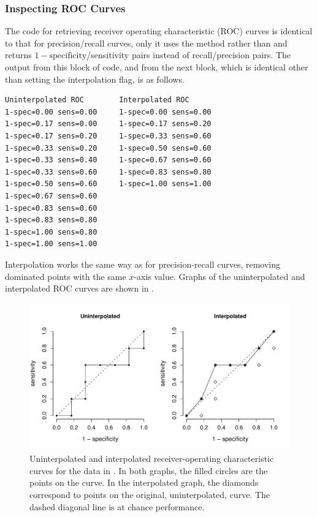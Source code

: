 \subsubsection{Inspecting ROC Curves}

The code for retrieving receiver operating characteristic (ROC) curves
is identical to that for precision/recall curves, only it uses the
method  rather than 
and returns $1-\mbox{specificity}$/sensitivity pairs instead of
recall/precision pairs.
%
%
The output from this block of code, and from the next block, which is
identical other than setting the interpolation flag, is as follows.
%
\begin{verbatim}
Uninterpolated ROC        Interpolated ROC
1-spec=0.00 sens=0.00     1-spec=0.00 sens=0.00
1-spec=0.17 sens=0.00     1-spec=0.17 sens=0.20
1-spec=0.17 sens=0.20     1-spec=0.33 sens=0.60
1-spec=0.33 sens=0.20     1-spec=0.50 sens=0.60
1-spec=0.33 sens=0.40     1-spec=0.67 sens=0.60
1-spec=0.33 sens=0.60     1-spec=0.83 sens=0.80
1-spec=0.50 sens=0.60     1-spec=1.00 sens=1.00
1-spec=0.67 sens=0.60
1-spec=0.83 sens=0.60
1-spec=0.83 sens=0.80
1-spec=1.00 sens=0.80
1-spec=1.00 sens=1.00
\end{verbatim}
%
Interpolation works the same way as for precision-recall curves,
removing dominated points with the same $x$-axis value.  
Graphs of the uninterpolated and interpolated ROC curves are shown in 
.
%
\begin{figure}
\begin{center}
\includegraphics[height=2.5in]{pdfs/roc-curves.pdf}
\vspace*{-24pt}
\end{center}
\caption{Uninterpolated and interpolated receiver-operating
  characteristic curves for the data in .  In
  both graphs, the filled circles are the points on the curve.  In the
  interpolated graph, the diamonds correspond to points on the
  original, uninterpolated, curve.  The dashed diagonal line is
  at chance performance.}\label{fig:roc-curves}
\end{figure}



